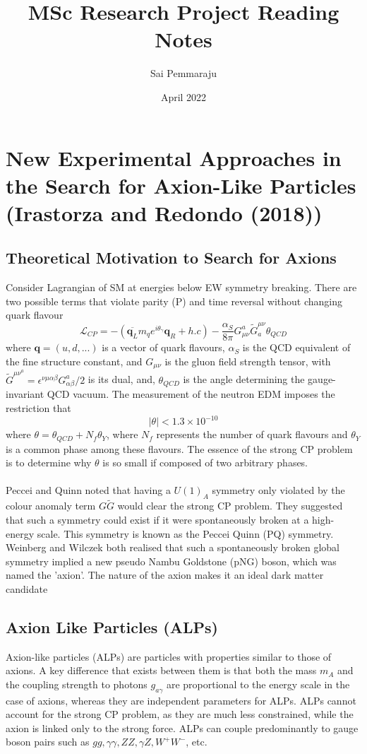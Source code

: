 \documentclass{article}
\title{MSc Research Project Reading Notes}
\author{Sai Pemmaraju}
\date{April 2022}
\begin{document}
\maketitle
\section{New Experimental Approaches in the Search for Axion-Like Particles (Irastorza and Redondo (2018))}
\subsection*{Theoretical Motivation to Search for Axions}
Consider Lagrangian of SM at energies below EW symmetry breaking. There are two possible terms that violate parity (P) and time reversal without changing quark flavour
\begin{equation}
    \mathcal{L}_{CP} = -(\overline{\textbf{q}_{L}}m_{q}e^{i\theta_{\gamma}}\textbf{q}_{R}+ h.c)-\frac{\alpha_{S}}{8\pi}G^{a}_{\mu\nu}\tilde{G}^{\mu\nu}_{a}\theta_{QCD}
\end{equation}
where $\textbf{q} = (u, d, ...)$ is a vector of quark flavours, $\alpha_{S}$ is the QCD equivalent of the fine structure constant, and $G_{\mu\nu}$ is the gluon field strength tensor,
with $\tilde{G}^{\mu\nu^{a}} = \epsilon^{\nu\mu\alpha\beta}G_{\alpha\beta}^{a}/2$ is its dual, and, $\theta_{QCD}$ is the angle determining the gauge-invariant QCD vacuum. The measurement of the neutron EDM imposes the restriction that
$$|\theta| < 1.3\times 10^{-10}$$
where $\theta = \theta_{QCD}+N_{f}\theta_{Y}$, where $N_{f}$ represents the number of quark flavours and $\theta_{Y}$ is a common phase among these flavours. The essence of the strong CP problem is to determine why $\theta$ is so small if composed of two arbitrary phases.\\
\\
Peccei and Quinn noted that having a $U(1)_{A}$ symmetry only violated by the colour anomaly term $G\tilde{G}$ would clear the strong CP problem. They suggested that such a symmetry could exist if it were spontaneously broken at a high-energy scale. This symmetry is known as the Peccei Quinn (PQ) symmetry. 
Weinberg and Wilczek both realised that such a spontaneously broken global symmetry implied a new pseudo Nambu Goldstone (pNG) boson, which was named the 'axion'. The nature of the axion makes it an ideal dark matter candidate

\subsection*{Axion Like Particles (ALPs)}
Axion-like particles (ALPs) are particles with properties similar to those of axions. A key difference that exists between them is that both the mass $m_{A}$ and the coupling strength to photons $g_{a\gamma}$ are proportional to the energy scale
in the case of axions, whereas they are independent parameters for ALPs. ALPs cannot account for the strong CP problem, as they are much less constrained, while the axion is linked only to the strong force. ALPs can couple predominantly to gauge boson pairs such as $gg, \gamma\gamma, ZZ, \gamma Z, W^{+}W^{-}$, etc.
\end{document}
